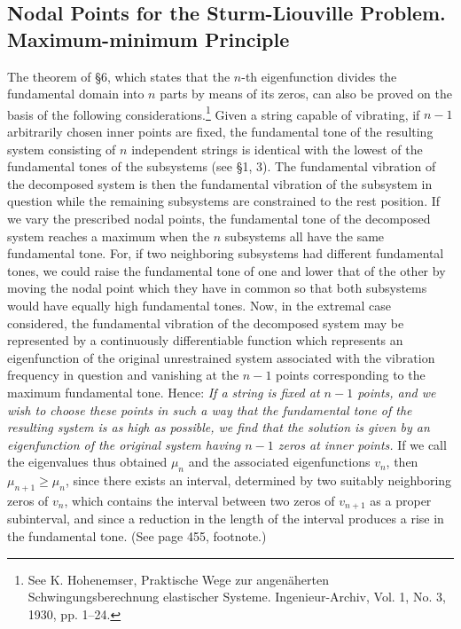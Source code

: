 \subsection{Nodal Points for the Sturm-Liouville Problem. Maximum-minimum Principle}
The theorem of \S6, which states that the $n$-th eigenfunction divides the fundamental domain into $n$ parts by means of its zeros, can also be proved on the basis of the following considerations.\footnote{See K. Hohenemser, Praktische Wege zur angenäherten Schwingungsberechnung elastischer Systeme. Ingenieur-Archiv, Vol. 1, No. 3, 1930, pp. 1--24.} Given a string capable of vibrating, if $n-1$ arbitrarily chosen inner points are fixed, the fundamental tone of the resulting system consisting of $n$ independent strings is identical with the lowest of the fundamental tones of the subsystems (see \S1, 3). The fundamental vibration of the decomposed system is then the fundamental vibration of the subsystem in question while the remaining subsystems are constrained to the rest position. If we vary the prescribed nodal points, the fundamental tone of the decomposed system reaches a maximum when the $n$ subsystems all have the same fundamental tone. For, if two neighboring subsystems had different fundamental tones, we could raise the fundamental tone of one and lower that of the other by moving the nodal point which they have in common so that both subsystems would have equally high fundamental tones. Now, in the extremal case considered, the fundamental vibration of the decomposed system may be represented by a continuously differentiable function which represents an eigenfunction of the original unrestrained system associated with the vibration frequency in question and vanishing at the $n-1$ points corresponding to the maximum fundamental tone. Hence: \emph{If a string is fixed at $n-1$ points, and we wish to choose these points in such a way that the fundamental tone of the resulting system is as high as possible, we find that the solution is given by an eigenfunction of the original system having $n-1$ zeros at inner points.} If we call the eigenvalues thus obtained $\mu_n$ and the associated eigenfunctions $v_n$, then $\mu_{n+1}\ge\mu_n$, since there exists an interval, determined by two suitably neighboring zeros of $v_n$, which contains the interval between two zeros of $v_{n+1}$ as a proper subinterval, and since a reduction in the length of the interval produces a rise in the fundamental tone. (See page 455, footnote.)

